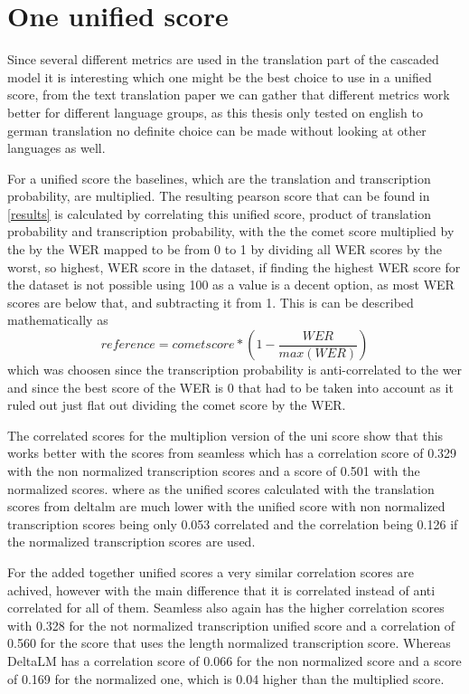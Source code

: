 \section{One unified score}
Since several different metrics are used in the translation part of the cascaded model it is interesting which one might be the best choice to use in a unified score, from the text translation paper \cite{fomicheva2020unsupervised} we can gather that different metrics work better for different language groups, as this thesis only tested on english to german translation no definite choice can be made without looking at other languages as well.


For a unified score the baselines, which are the translation and transcription probability, are multiplied. 
The resulting pearson score that can be found in \autoref{results} is calculated by correlating this unified score, product of translation probability and transcription probability, with the the comet score multiplied by the by the WER mapped to be from 0 to 1 by dividing all WER scores by the worst, so highest, WER score in the dataset, if finding the highest WER score for the dataset is not possible using 100 as a value is a decent option, as most WER scores are below that, and subtracting it from 1. 
This is can be described mathematically as 
$$reference = cometscore*(1-\frac{WER}{max(WER)})$$
which was choosen since the transcription probability is anti-correlated to the wer and since the best score of the WER is 0 that had to be taken into account as it ruled out just flat out dividing the comet score by the WER.

The correlated scores for the multiplion version of the uni score show that this works better with the scores from seamless which has a correlation score of 0.329 with the non normalized transcription scores and a score of 0.501 with the normalized scores. where as the unified scores calculated with the translation scores from deltalm are much lower with the unified score with non normalized transcription scores being only 0.053 correlated and the correlation being 0.126 if the normalized transcription scores are used. 

For the added together unified scores a very similar correlation scores are achived, however with the main difference that it is correlated instead of anti correlated for all of them. Seamless also again has the higher correlation scores with 0.328 for the not normalized transcription unified score and a correlation of 0.560 for the score that uses the length normalized  transcription score. Whereas DeltaLM has a correlation score of 0.066 for the non normalized score and a score of 0.169 for the normalized one, which is 0.04 higher than the multiplied score. 

